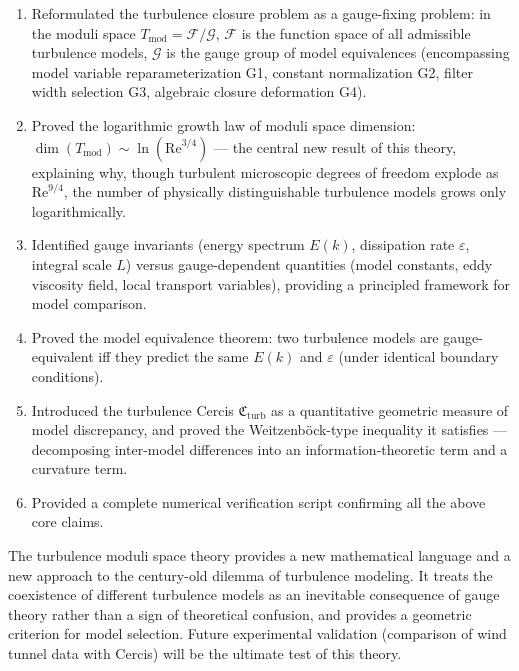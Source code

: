 \documentclass[12pt,a4paper]{article}
\theoremstyle{plain}
\theoremstyle{definition}
\theoremstyle{remark}
\newcommand{\F}{\mathcal{F}}
\newcommand{\G}{\mathcal{G}}
\newcommand{\cercis}{\mathfrak{C}}
\newcommand{\Tmod}{T_{\text{mod}}}
\newcommand{\ReNum}{\mathrm{Re}}
\newcommand{\eps}{\varepsilon}
\begin{document}
\begin{enumerate}[label=\textbf{(\arabic*)}]
    \item Reformulated the turbulence closure problem as a gauge-fixing problem: in the moduli space $\Tmod = \F/\G$, $\F$ is the function space of all admissible turbulence models, $\G$ is the gauge group of model equivalences (encompassing model variable reparameterization G1, constant normalization G2, filter width selection G3, algebraic closure deformation G4).

    \item Proved the logarithmic growth law of moduli space dimension: $\dim(\Tmod) \sim \ln(\ReNum^{3/4})$ --- the central new result of this theory, explaining why, though turbulent microscopic degrees of freedom explode as $\ReNum^{9/4}$, the number of physically distinguishable turbulence models grows only logarithmically.

    \item Identified gauge invariants (energy spectrum $E(k)$, dissipation rate $\eps$, integral scale $L$) versus gauge-dependent quantities (model constants, eddy viscosity field, local transport variables), providing a principled framework for model comparison.

    \item Proved the model equivalence theorem: two turbulence models are gauge-equivalent iff they predict the same $E(k)$ and $\eps$ (under identical boundary conditions).

    \item Introduced the turbulence Cercis $\cercis_{\text{turb}}$ as a quantitative geometric measure of model discrepancy, and proved the Weitzenb\"ock-type inequality it satisfies --- decomposing inter-model differences into an information-theoretic term and a curvature term.

    \item Provided a complete numerical verification script confirming all the above core claims.
\end{enumerate}

The turbulence moduli space theory provides a new mathematical language and a new approach to the century-old dilemma of turbulence modeling. It treats the coexistence of different turbulence models as an inevitable consequence of gauge theory rather than a sign of theoretical confusion, and provides a geometric criterion for model selection. Future experimental validation (comparison of wind tunnel data with Cercis) will be the ultimate test of this theory.
\end{document}
